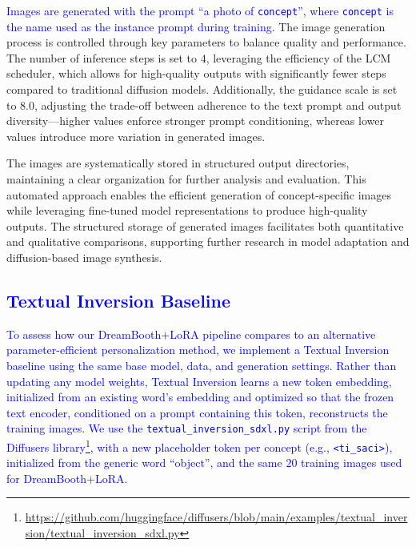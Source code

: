 \documentclass[pdflatex,sn-mathphys-num]{sn-jnl}%
\theoremstyle{thmstyleone}%
\theoremstyle{thmstyletwo}%
\theoremstyle{thmstylethree}%
\begin{document}
\textcolor{blue}{Images are generated with the prompt ``a photo of \texttt{concept}'', where \texttt{concept} is the name used as the instance prompt during training.} The image generation process is controlled through key parameters to balance quality and performance. The number of inference steps is set to $4$, leveraging the efficiency of the LCM scheduler, which allows for high-quality outputs with significantly fewer steps compared to traditional diffusion models. Additionally, the guidance scale is set to $8.0$, adjusting the trade-off between adherence to the text prompt and output diversity—higher values enforce stronger prompt conditioning, whereas lower values introduce more variation in generated images.

The images are systematically stored in structured output directories, maintaining a clear organization for further analysis and evaluation. This automated approach enables the efficient generation of concept-specific images while leveraging fine-tuned model representations to produce high-quality outputs. The structured storage of generated images facilitates both quantitative and qualitative comparisons, supporting further research in model adaptation and diffusion-based image synthesis.

\subsection{\textcolor{blue}{Textual Inversion Baseline}}
\label{sec:ti-method}

\textcolor{blue}{To assess how our DreamBooth+LoRA pipeline compares to an alternative parameter-efficient personalization method, we implement a Textual Inversion~\cite{gal2023textual} baseline using the same base model, data, and generation settings. Rather than updating any model weights, Textual Inversion learns a new token embedding, initialized from an existing word's embedding and optimized so that the frozen text encoder, conditioned on a prompt containing this token, reconstructs the training images. We use the \texttt{textual\_inversion\_sdxl.py} script from the Diffusers library\footnote{\url{https://github.com/huggingface/diffusers/blob/main/examples/textual_inversion/textual_inversion_sdxl.py}}, with a new placeholder token per concept (e.g., \texttt{<ti\_saci>}), initialized from the generic word ``object'', and the same $20$ training images used for DreamBooth+LoRA.}
\end{document}

